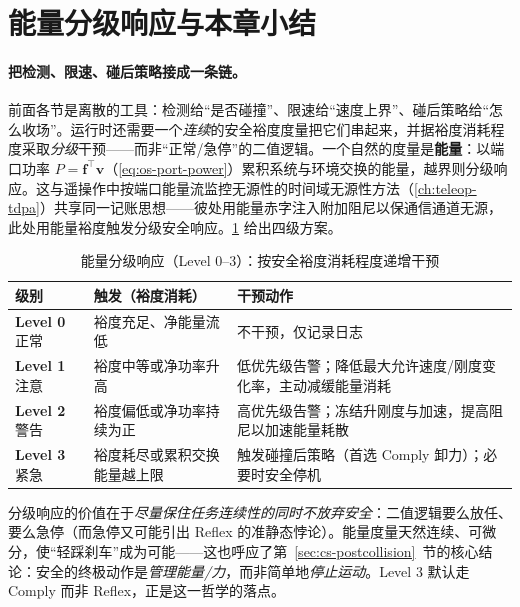 \section{能量分级响应与本章小结}
\label{sec:cs-energy}

\paragraph{把检测、限速、碰后策略接成一条链。}
前面各节是离散的工具：检测给“是否碰撞”、限速给“速度上界”、碰后策略给“怎么收场”。运行时还需要一个\emph{连续}的安全裕度度量把它们串起来，并据裕度消耗程度采取\emph{分级}干预——而非“正常/急停”的二值逻辑。一个自然的度量是\textbf{能量}：以端口功率 $P=\mathbf f^\top\mathbf v$（\cref{eq:os-port-power}）累积系统与环境交换的能量，越界则分级响应。这与遥操作中按端口能量流监控无源性的时间域无源性方法（\cref{ch:teleop-tdpa}）共享同一记账思想——彼处用能量赤字注入附加阻尼以保通信通道无源，此处用能量裕度触发分级安全响应。\cref{tab:cs-levels} 给出四级方案。

\begin{table}[H]\centering\small
\caption{能量分级响应（Level 0--3）：按安全裕度消耗程度递增干预}
\label{tab:cs-levels}
\begin{tabular}{llp{6.4cm}}
\toprule
级别 & 触发（裕度消耗） & 干预动作 \\
\midrule
\textbf{Level 0} 正常 & 裕度充足、净能量流低 & 不干预，仅记录日志 \\
\textbf{Level 1} 注意 & 裕度中等或净功率升高 & 低优先级告警；降低最大允许速度/刚度变化率，主动减缓能量消耗 \\
\textbf{Level 2} 警告 & 裕度偏低或净功率持续为正 & 高优先级告警；冻结升刚度与加速，提高阻尼以加速能量耗散 \\
\textbf{Level 3} 紧急 & 裕度耗尽或累积交换能量越上限 & 触发碰撞后策略（首选 Comply 卸力）；必要时安全停机 \\
\bottomrule
\end{tabular}
\end{table}

\begin{insight}
分级响应的价值在于\emph{尽量保住任务连续性的同时不放弃安全}：二值逻辑要么放任、要么急停（而急停又可能引出 Reflex 的准静态悖论）。能量度量天然连续、可微分，使“轻踩刹车”成为可能——这也呼应了第~\ref{sec:cs-postcollision}~节的核心结论：安全的终极动作是\emph{管理能量/力}，而非简单地\emph{停止运动}。Level 3 默认走 Comply 而非 Reflex，正是这一哲学的落点。
\end{insight}

